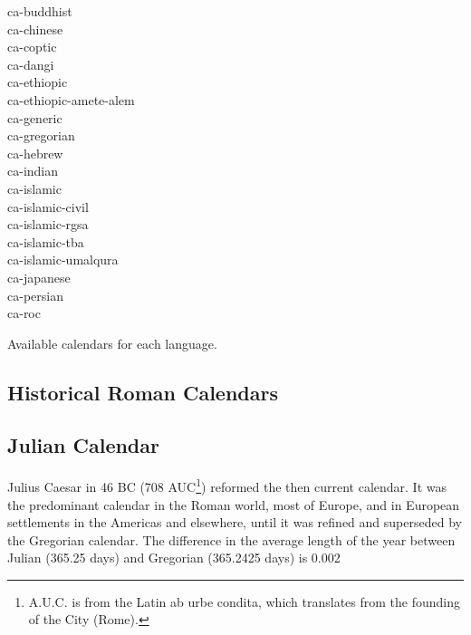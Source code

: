 \begin{table}[ht]

\begin{multicols}{2}
ca-buddhist\\
ca-chinese\\
ca-coptic\\
ca-dangi\\
ca-ethiopic\\
ca-ethiopic-amete-alem\\
ca-generic\\
ca-gregorian\\
ca-hebrew\\
ca-indian\\
ca-islamic\\
ca-islamic-civil\\
ca-islamic-rgsa\\
ca-islamic-tba\\
ca-islamic-umalqura\\
ca-japanese\\
ca-persian\\
ca-roc\\
\end{multicols}
\caption{Available calendars for each language.}
\end{table}

\subsection{Historical Roman Calendars}

\subsection{Julian Calendar}

Julius Caesar in 46 BC (708 AUC\footnote{A.U.C. is from the Latin ab urbe condita, which translates from the founding of the City (Rome).}) reformed the then current calendar.   It was the predominant calendar in the Roman world, most of Europe, and in European settlements in the Americas and elsewhere, until it was refined and superseded by the Gregorian calendar. The difference in the average length of the year between Julian (365.25 days) and Gregorian (365.2425 days) is 0.002%

